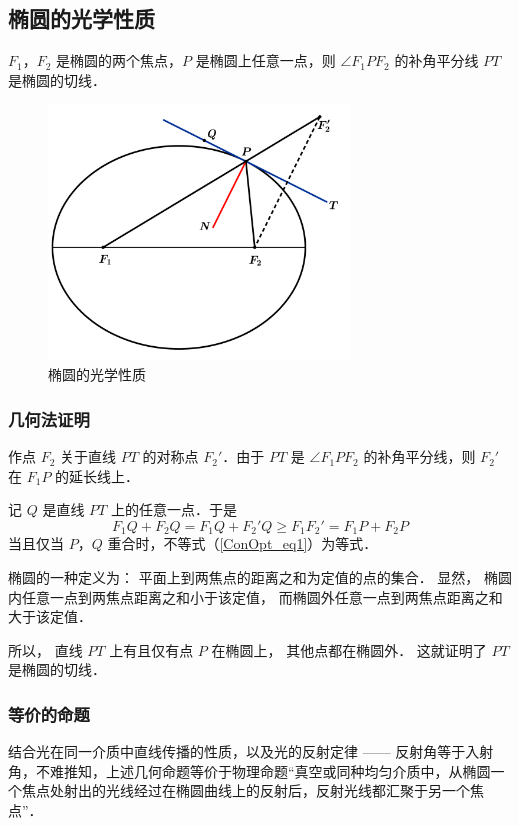 \subsection{椭圆的光学性质}
$F_1$，$F_2$ 是椭圆的两个焦点，$ P $ 是椭圆上任意一点，则 $\angle F_1PF_2 $ 的补角平分线 $ PT $ 是椭圆的切线．
\begin{figure}[ht]
\centering
\includegraphics[width=8cm]{./figures/ConOpt3.pdf}
\caption{椭圆的光学性质} \label{ConOpt_fig3}
\end{figure}
\subsubsection{几何法证明}
作点 $F_2$ 关于直线 $PT$ 的对称点 $F_2'$．由于 $PT$ 是 $\angle F_1PF_2 $ 的补角平分线，则 $F_2'$ 在 $F_1P$ 的延长线上．

记 $Q$ 是直线 $PT$ 上的任意一点．于是
\begin{equation}\label{ConOpt_eq1}
F_1Q + F_2Q = F_1Q + F_2'Q \geqslant F_1F_2' = F_1P + F_2P
\end{equation}
当且仅当 $P$，$Q$ 重合时，不等式（\autoref{ConOpt_eq1}）为等式．

椭圆的一种定义为：
平面上到两焦点的距离之和为定值的点的集合． 显然， 椭圆内任意一点到两焦点距离之和小于该定值， 而椭圆外任意一点到两焦点距离之和大于该定值． 

所以， 直线 $PT$ 上有且仅有点 $P$ 在椭圆上， 其他点都在椭圆外． 这就证明了 $PT$ 是椭圆的切线．

\subsubsection{等价的命题}
结合光在同一介质中直线传播的性质，以及光的反射定律 —— 反射角等于入射角，不难推知，上述几何命题等价于物理命题“真空或同种均匀介质中，从椭圆一个焦点处射出的光线经过在椭圆曲线上的反射后，反射光线都汇聚于另一个焦点”．

